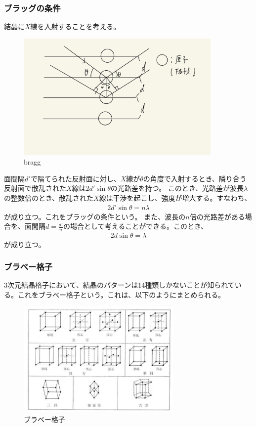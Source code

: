 \documentclass[a4paper,11pt]{jsarticle}
\begin{document}
\subsubsection{ブラッグの条件}
結晶に$X$線を入射することを考える。
\begin{figure}[H]
    \begin{center}
    \includegraphics[width=100mm]{image2.jpg}
    \end{center}
    \caption{bragg}
    \label{fig:bragg}
\end{figure}

面間隔$d'$で隔てられた反射面に対し、$X$線が$\theta$の角度で入射するとき、隣り合う反射面で散乱された$X$線は$2d'\sin\theta$の光路差を持つ。
このとき、光路差が波長$\lambda$の整数倍のとき、散乱された$X$線は干渉を起こし、強度が増大する。すなわち、
\begin{align}
  2d'\sin\theta = n\lambda
\end{align}
が成り立つ。これをブラッグの条件という。
また、波長の$n$倍の光路差がある場合を、面間隔$d=\frac{d'}{n}$の場合として考えることができる。このとき、
\begin{align}
  2d\sin\theta = \lambda
\end{align}
が成り立つ。

\subsubsection{ブラべー格子}
3次元結晶格子において、結晶のパターンは14種類しかないことが知られている。これをブラベー格子という。これは、以下のようにまとめられる。
\begin{figure}[H]
    \begin{center}
    \includegraphics[width=80mm]{Bravais.jpg}
    \end{center}
    \caption{ブラベー格子}
    \label{fig:b}
\end{figure}
\end{document}
